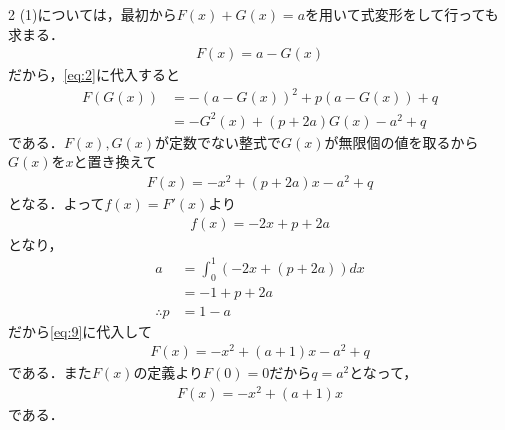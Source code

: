 \documentclass[../../main.tex]{subfiles}
\begin{document}
\begin{multicols}{2}
  (1)については，最初から$F(x)+G(x)=a$を用いて式変形をして行っても求まる．
  \begin{align}
    F(x) = a-G(x)
  \end{align}
  だから，\cref{eq:2}に代入すると
  \begin{align}
    F(G(x))
    & = -\left(a-G(x)\right)^2 + p\left(a-G(x)\right) + q \\
    & = -G^2(x)+\left(p+2a\right)G(x)-a^2+q
  \end{align}
  である．$F(x), G(x)$が定数でない整式で$G(x)$が無限個の値を取るから$G(x)$を$x$と置き換えて
  \begin{align}
    F(x) = -x^2+(p+2a)x-a^2+q \label{eq:9}
  \end{align}
  となる．よって$f(x)=F'(x)$より
  \begin{align}
    f(x) = -2x + p + 2a
  \end{align}
  となり，
  \begin{align}
    a
    & = \int_0^1 (-2x+(p+2a)) dx \\
    & = -1+p+2a                  \\
    \therefore
    p & = 1-a
  \end{align}
  だから\cref{eq:9}に代入して
  \begin{align}
    F(x) = -x^2+(a+1)x -a^2+q
  \end{align}
  である．また$F(x)$の定義より$F(0)=0$だから$q=a^2$となって，
  \begin{align}
    F(x) = -x^2+(a+1)x
  \end{align}
  である．

  \newpage
\end{multicols}
\end{document}
